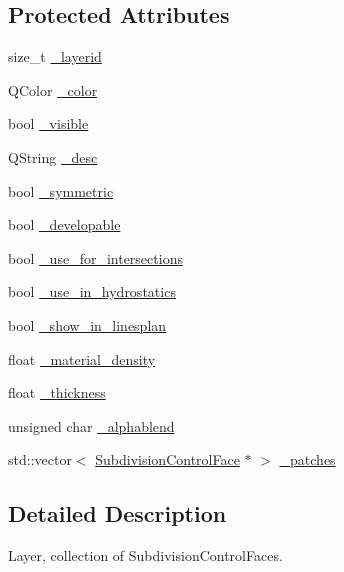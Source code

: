 \subsection*{Protected Attributes}
\begin{DoxyCompactItemize}
\item 
size\+\_\+t \hyperlink{classShipCAD_1_1SubdivisionLayer_a73e4956d179d6ebd6c062e7e76bca196}{\+\_\+layerid}
\item 
Q\+Color \hyperlink{classShipCAD_1_1SubdivisionLayer_a6da22248952737662360fa3b2730a35f}{\+\_\+color}
\item 
bool \hyperlink{classShipCAD_1_1SubdivisionLayer_a2d606476aba40bbbfc115c449f46ac26}{\+\_\+visible}
\item 
Q\+String \hyperlink{classShipCAD_1_1SubdivisionLayer_a33bbfedf8f0d130d91c74a65a575eb2a}{\+\_\+desc}
\item 
bool \hyperlink{classShipCAD_1_1SubdivisionLayer_aaeddcdf1d08d84c76c5453f4a71fbe7a}{\+\_\+symmetric}
\item 
bool \hyperlink{classShipCAD_1_1SubdivisionLayer_a81dad738f58f9b4632c1575d0b59ddb0}{\+\_\+developable}
\item 
bool \hyperlink{classShipCAD_1_1SubdivisionLayer_a8213aa3e02493472fb11949f595446f2}{\+\_\+use\+\_\+for\+\_\+intersections}
\item 
bool \hyperlink{classShipCAD_1_1SubdivisionLayer_ad36d65882f0c46ff1b3ced7d48c173f4}{\+\_\+use\+\_\+in\+\_\+hydrostatics}
\item 
bool \hyperlink{classShipCAD_1_1SubdivisionLayer_a373fd987b5f973a995517e7f97fda5ac}{\+\_\+show\+\_\+in\+\_\+linesplan}
\item 
float \hyperlink{classShipCAD_1_1SubdivisionLayer_adfdd4e996a5be7147a2eeb682dd93ff8}{\+\_\+material\+\_\+density}
\item 
float \hyperlink{classShipCAD_1_1SubdivisionLayer_a00a308fdf03a0c1d9a6fa65f965e7942}{\+\_\+thickness}
\item 
unsigned char \hyperlink{classShipCAD_1_1SubdivisionLayer_a1681170da038b0708d1b4dcd2ec89b81}{\+\_\+alphablend}
\item 
std\+::vector$<$ \hyperlink{classShipCAD_1_1SubdivisionControlFace}{Subdivision\+Control\+Face} $\ast$ $>$ \hyperlink{classShipCAD_1_1SubdivisionLayer_a98b25b86a7104e4f987d34506438113f}{\+\_\+patches}
\end{DoxyCompactItemize}


\subsection{Detailed Description}
Layer, collection of Subdivision\+Control\+Faces. 

